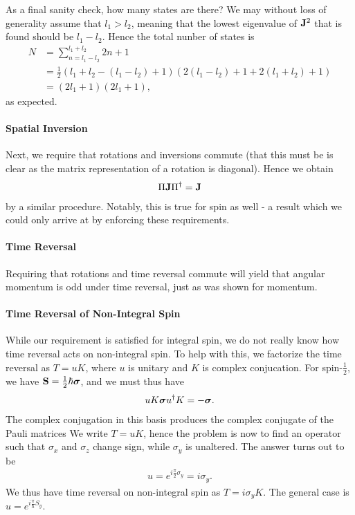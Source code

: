 As a final sanity check, how many states are there? We may without loss of generality assume that $l_{1} > l_{2}$, meaning that the lowest eigenvalue of $\vb{J}^{2}$ that is found should be $l_{1} - l_{2}$. Hence the total nunber of states is
\begin{align*}
	N &= \sum\limits_{n = l_{1} - l_{2}}^{l_{1} + l_{2}}2n + 1 \\
	  &= \frac{1}{2}(l_{1} + l_{2} - (l_{1} - l_{2}) + 1)\left(2(l_{1} - l_{2}) + 1 + 2(l_{1} + l_{2}) + 1\right) \\
	  &= (2l_{1} + 1)\left(2l_{1} + 1\right),
\end{align*}
as expected.

\paragraph{Spatial Inversion}
Next, we require that rotations and inversions commute (that this must be is clear as the matrix representation of a rotation is diagonal). Hence we obtain
\begin{align*}
	\Pi\vb{J}\Pi^{\dagger} = \vb{J}
\end{align*}
by a similar procedure. Notably, this is true for spin as well - a result which we could only arrive at by enforcing these requirements.

\paragraph{Time Reversal}
Requiring that rotations and time reversal commute will yield that angular momentum is odd under time reversal, just as was shown for momentum.

\paragraph{Time Reversal of Non-Integral Spin}
While our requirement is satisfied for integral spin, we do not really know how time reversal acts on non-integral spin. To help with this, we factorize the time reversal as $T = uK$, where $u$ is unitary and $K$ is complex conjucation. For spin-$\frac{1}{2}$, we have $\vb{S} = \frac{1}{2}\hbar\vb*{\sigma}$, and we must thus have
\begin{align*}
	uK\vb*{\sigma}u^{\dagger}K = -\vb*{\sigma}.
\end{align*}
The complex conjugation in this basis produces the complex conjugate of the Pauli matrices
We write $T = uK$, hence the problem is now to find an operator such that $\sigma_{x}$ and $\sigma_{z}$ change sign, while $\sigma_{y}$ is unaltered. The answer turns out to be
\begin{align*}
	u = e^{i\frac{\pi}{2}\sigma_{y}} = i\sigma_{y}.
\end{align*}
We thus have time reversal on non-integral spin as $T = i\sigma_{y}K$. The general case is $u = e^{i\frac{\pi}{\hbar}S_{y}}$.

